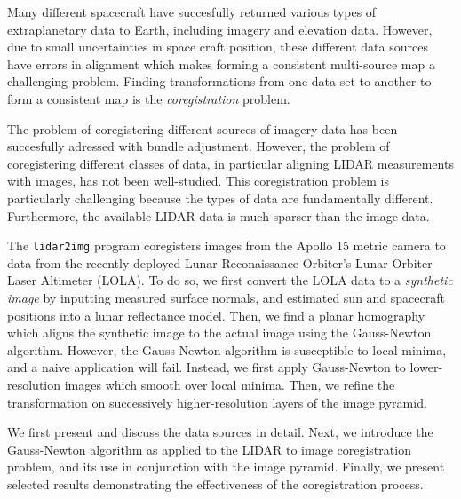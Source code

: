 
Many different spacecraft have succesfully returned various types of extraplanetary data to Earth,
including imagery and elevation data. However, due to small uncertainties in space craft
position, these different data sources have errors in alignment which makes forming a
consistent multi-source map a challenging problem. Finding transformations from one data
set to another to form a consistent map is the {\emph{coregistration}} problem.

The problem of coregistering different sources of imagery data has been succesfully adressed
with bundle adjustment. However, the problem of coregistering different classes
of data, in particular aligning LIDAR measurements with images, has not been well-studied.
This coregistration problem is particularly challenging because the types of data are
fundamentally different. Furthermore, the available LIDAR data is much sparser than
the image data.

The {\texttt{lidar2img}} program coregisters images
from the Apollo 15 metric camera to data from the recently deployed Lunar Reconaissance Orbiter's
Lunar Orbiter Laser Altimeter (LOLA). To do so, we first convert the LOLA data to a
{\emph{synthetic image}} by inputting measured surface normals, and estimated sun and spacecraft
positions into a lunar reflectance model. Then, we find a planar homography which aligns the synthetic
image to the actual image using the Gauss-Newton algorithm.  However, the Gauss-Newton algorithm is
susceptible to local minima, and a naive application will fail. Instead, we first
apply Gauss-Newton to lower-resolution images which smooth over local minima. Then, we
refine the transformation on successively higher-resolution layers of the image pyramid.

We first present and discuss the data sources in detail. Next, we introduce the
Gauss-Newton algorithm as applied to the LIDAR to image coregistration problem,
and its use in conjunction with the image pyramid. Finally, we present selected
results demonstrating the effectiveness of the coregistration process.


